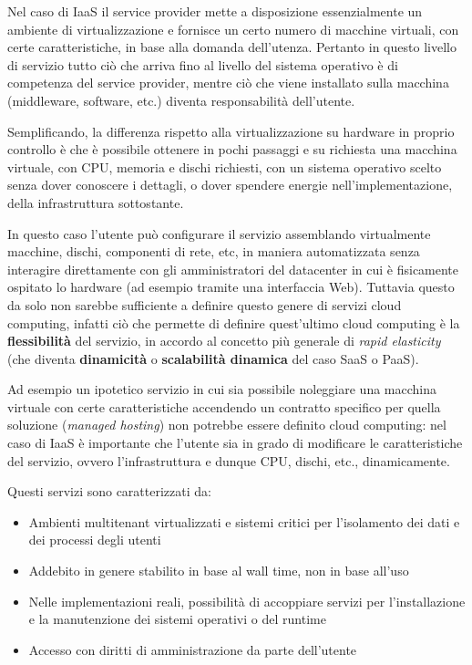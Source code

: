 \documentclass[italian,]{article}
\providecommand{\tightlist}{%
  \setlength{\itemsep}{0pt}\setlength{\parskip}{0pt}}
\begin{document}
Nel caso di IaaS il service provider mette a disposizione essenzialmente
un ambiente di virtualizzazione e fornisce un certo numero di macchine
virtuali, con certe caratteristiche, in base alla domanda dell'utenza.
Pertanto in questo livello di servizio tutto ciò che arriva fino al
livello del sistema operativo è di competenza del service provider,
mentre ciò che viene installato sulla macchina (middleware, software,
etc.) diventa responsabilità dell'utente.

Semplificando, la differenza rispetto alla virtualizzazione su hardware
in proprio controllo è che è possibile ottenere in pochi passaggi e su
richiesta una macchina virtuale, con CPU, memoria e dischi richiesti,
con un sistema operativo scelto senza dover conoscere i dettagli, o
dover spendere energie nell'implementazione, della infrastruttura
sottostante.

In questo caso l'utente può configurare il servizio assemblando
virtualmente macchine, dischi, componenti di rete, etc, in maniera
automatizzata senza interagire direttamente con gli amministratori del
datacenter in cui è fisicamente ospitato lo hardware (ad esempio tramite
una interfaccia Web). Tuttavia questo da solo non sarebbe sufficiente a
definire questo genere di servizi cloud computing, infatti ciò che
permette di definire quest'ultimo cloud computing è la
\textbf{flessibilità} del servizio, in accordo al concetto più generale
di \emph{rapid elasticity} (che diventa \textbf{dinamicità} o
\textbf{scalabilità dinamica} del caso SaaS o PaaS).

Ad esempio un ipotetico servizio in cui sia possibile noleggiare una
macchina virtuale con certe caratteristiche accendendo un contratto
specifico per quella soluzione (\emph{managed hosting}) non potrebbe
essere definito cloud computing: nel caso di IaaS è importante che
l'utente sia in grado di modificare le caratteristiche del servizio,
ovvero l'infrastruttura e dunque CPU, dischi, etc., dinamicamente.

Questi servizi sono caratterizzati da:

\begin{itemize}
\tightlist
\item
  Ambienti multitenant virtualizzati e sistemi critici per l'isolamento
  dei dati e dei processi degli utenti
\item
  Addebito in genere stabilito in base al wall time, non in base all'uso
\item
  Nelle implementazioni reali, possibilità di accoppiare servizi per
  l'installazione e la manutenzione dei sistemi operativi o del runtime
\item
  Accesso con diritti di amministrazione da parte dell'utente
\end{itemize}
\end{document}
